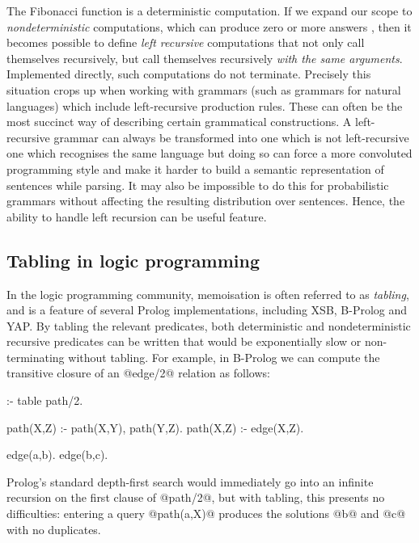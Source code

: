 The Fibonacci function is a deterministic computation. If we expand our scope to 
\emph{nondeterministic} computations, which can produce zero or more answers
\cite{Wadler1985}, then it becomes possible to define \emph{left recursive} computations that not
only call themselves recursively, but call themselves recursively \emph{with the
same arguments}. Implemented directly, such computations do not terminate.
Precisely this situation crops up when working with grammars
(such as grammars for natural languages) which include left-recursive production rules.
These can often be the most succinct way of describing certain grammatical
constructions. A left-recursive grammar can always be transformed into one
which is not left-recursive one which recognises the same language 
\cite{Moore2000,JohnsonRoark2000} but
doing so can force a more convoluted programming style and make it harder to
build a semantic representation of sentences while parsing. It may also be
impossible to do this for probabilistic grammars without affecting the resulting
distribution over sentences.
Hence, the ability to handle left recursion can be useful feature.


\subsection{Tabling in logic programming}
\label{s:memologic}
In the logic programming community, memoisation is often referred to as \emph{tabling},
and is a feature of several Prolog implementations, including XSB, B-Prolog and YAP.
By tabling the relevant predicates, both deterministic and
nondeterministic recursive predicates can be written that would be exponentially
slow or non-terminating without tabling. For example, in B-Prolog we can compute
the transitive closure of an @edge/2@ relation as follows:
\begin{prolog}
	:- table path/2.

	path(X,Z) :- path(X,Y), path(Y,Z).
	path(X,Z) :- edge(X,Z).

	edge(a,b).
	edge(b,c).
\end{prolog}
Prolog's standard depth-first search would immediately go into an infinite recursion
on the first clause of @path/2@, but with tabling, this presents no difficulties: 
entering a query @path(a,X)@ produces
the solutions @b@ and @c@ with no duplicates.

